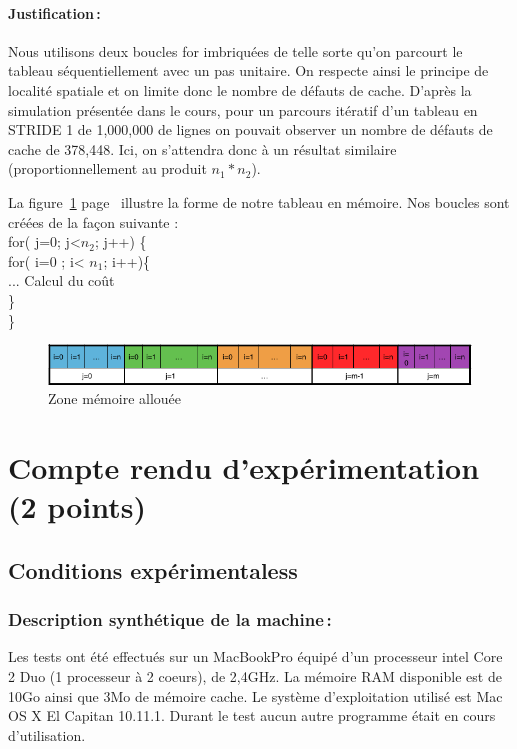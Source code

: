 \documentclass[a4paper, 10pt, french]{article}
\begin{document}
    \paragraph{Justification\,: }
    { Nous utilisons deux boucles for imbriquées de telle sorte qu'on parcourt le tableau séquentiellement avec un pas unitaire. On respecte ainsi le principe de localité spatiale et on limite donc le nombre de défauts de cache. D'après la simulation présentée dans le cours, pour un parcours itératif d'un tableau en STRIDE 1 de 1,000,000 de lignes on pouvait observer un nombre de défauts de cache de 378,448. Ici, on s'attendra donc à un résultat similaire (proportionnellement au produit $n_1*n_2$).
    
    La figure~\ref{étiquette} page~\pageref{étiquette} illustre la forme de notre tableau en mémoire. Nos boucles sont créées de la façon suivante : \\ for( j=0; j<$n_2$; j++) \{ \\ \indent for( i=0 ; i< $n_1$; i++)\{ \\ \indent \indent ... Calcul du coût \\ \indent \} \\ \}
	\begin{figure}[!h]
\hspace{1cm}
	\includegraphics[scale=0.6]{zone_mem.png}
	\caption{\label{étiquette} Zone mémoire allouée}
\end{figure}
    
    }


\section{Compte rendu d'expérimentation (2 points)}
  \subsection{Conditions expérimentaless}
  
    \subsubsection{Description synthétique de la machine\,:} 
      {Les tests ont été effectués sur un MacBookPro équipé d'un processeur intel Core 2 Duo (1 processeur à 2 coeurs), de 2,4GHz. La mémoire RAM disponible est de 10Go ainsi que 3Mo de mémoire cache. Le système d'exploitation utilisé est Mac OS X El Capitan 10.11.1. Durant le test aucun autre programme était en cours d'utilisation.
      } 
\end{document}
